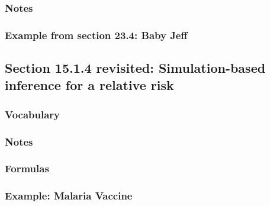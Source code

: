 \documentclass[
]{report}
\begin{document}
\hypertarget{notes-26}{%
\subsubsection*{Notes}\label{notes-26}}

\hypertarget{example-from-section-23.4-baby-jeff}{%
\subsubsection*{Example from section 23.4: Baby Jeff}\label{example-from-section-23.4-baby-jeff}}

\hypertarget{section-15.1.4-revisited-simulation-based-inference-for-a-relative-risk}{%
\subsection*{Section 15.1.4 revisited: Simulation-based inference for a relative risk}\label{section-15.1.4-revisited-simulation-based-inference-for-a-relative-risk}}

\hypertarget{vocabulary-20}{%
\subsubsection*{Vocabulary}\label{vocabulary-20}}

\hypertarget{notes-27}{%
\subsubsection*{Notes}\label{notes-27}}

\hypertarget{formulas-7}{%
\subsubsection*{Formulas}\label{formulas-7}}

\hypertarget{example-malaria-vaccine}{%
\subsubsection*{Example: Malaria Vaccine}\label{example-malaria-vaccine}}
\end{document}
